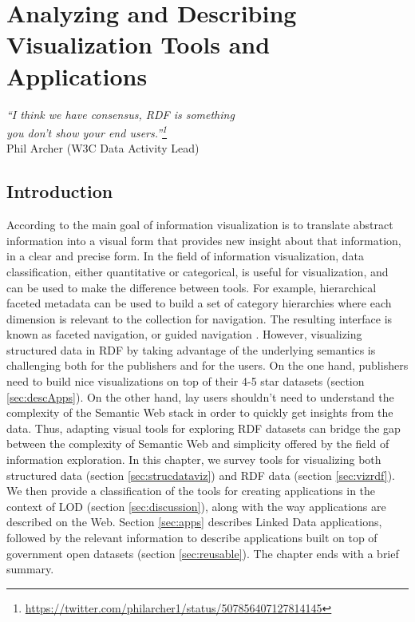 \chapter{Analyzing and Describing Visualization Tools and Applications}
\label{ch:ch4}

\begin{flushright}
\textit{``I think we have consensus, RDF is something \\
you don't show your end users.''\footnote{\url{https://twitter.com/philarcher1/status/507856407127814145}}}  \\
Phil Archer (W3C Data Activity Lead)
\end{flushright}

\section*{Introduction}
\label{sec:intro-ch4}
According to \cite{marti2009} the main goal of information visualization is to translate abstract information into a visual form that provides new insight about that information, in a clear and precise form. In the field of information visualization, data classification, either quantitative or categorical, is useful for visualization, and can be used to make the difference between tools. For example, hierarchical faceted metadata can be used to build a set of category hierarchies where each dimension is relevant to the collection for navigation. The resulting interface is known as faceted navigation, or guided navigation \cite{hearst02}. However, visualizing structured data in RDF by taking advantage of the underlying semantics is challenging both for the publishers and for the users. On the one hand, publishers need to build nice visualizations on top of their 4-5 star datasets (section \ref{sec:descApps}). On the other hand, lay users shouldn't need to understand the complexity of the Semantic Web stack in order to quickly get insights from the data. Thus, adapting visual tools for exploring RDF datasets can bridge the gap between the complexity of Semantic Web and simplicity offered by the field of information exploration. In this chapter, we survey tools for visualizing both structured data (section \ref{sec:strucdataviz}) and RDF data (section \ref{sec:vizrdf}). We then provide a classification of the tools for creating applications in the context of LOD (section \ref{sec:discussion}), along with the way applications are described on the Web. Section \ref{sec:apps} describes Linked Data applications, followed by the relevant information to describe applications built on top of government open datasets (section \ref{sec:reusable}). The chapter ends with a brief summary.

